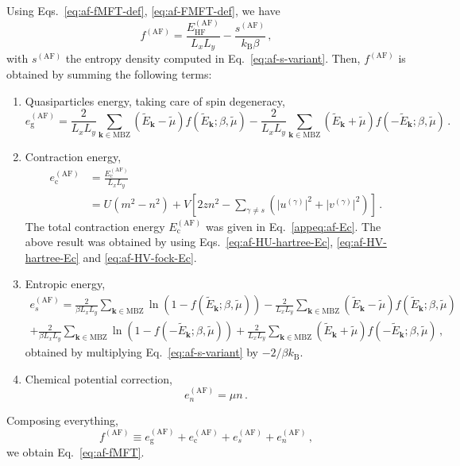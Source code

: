 \begin{tabproof}
	
	Using Eqs.~\eqref{eq:af-fMFT-def}, \eqref{eq:af-FMFT-def}, we have
	\[
	f^{(\mathrm{AF})} = \frac{E_\mathrm{HF}^{(\mathrm{AF})}}{L_x L_y} - \frac{s^{(\mathrm{AF})}}{k_\mathrm{B} \beta} \, ,
	\]
	with $s^{(\mathrm{AF})}$ the entropy density computed in Eq.~\eqref{eq:af-s-variant}. Then, $f^{(\mathrm{AF})}$ is obtained by summing the following terms:
	\begin{enumerate}
		\item Quasiparticles energy, taking care of spin degeneracy,
		\[
		e_\mathrm{g}^{(\mathrm{AF})} = \frac{2}{L_x L_y} \sum_{\mathbf{k} \in \mathrm{MBZ}} (\tilde{E}_\mathbf{k} - \tilde{\mu}) f( \tilde{E}_\mathbf{k}; \beta,\tilde{\mu}) - \frac{2}{L_x L_y} \sum_{\mathbf{k} \in \mathrm{MBZ}} (\tilde{E}_\mathbf{k} + \tilde{\mu}) f( -\tilde{E}_\mathbf{k}; \beta,\tilde{\mu}) \, .
		\]
		\item Contraction energy,
		\[
		\begin{aligned}
			e_\mathrm{c}^{(\mathrm{AF})} &= \frac{E_\mathrm{c}^{(\mathrm{AF})}}{L_x L_y} \\
			&= U(m^2 - n^2) + V \left[
			2zn^2 - \sum_{\gamma \neq s} \left(
			\big|u^{(\gamma)}\big|^2 + \big|v^{(\gamma)}\big|^2
			\right)
			\right] \, .
		\end{aligned}
		\]
		The total contraction energy $E_\mathrm{c}^{(\mathrm{AF})}$ was given in Eq.~\eqref{appeq:af-Ec}. The above result was obtained by using Eqs.~\eqref{eq:af-HU-hartree-Ec}, \eqref{eq:af-HV-hartree-Ec} and \eqref{eq:af-HV-fock-Ec}.
		\item Entropic energy,
		\begin{multline*}
			e_s^{(\mathrm{AF})} = \frac{2}{\beta L_x L_y} \sum_{\mathbf{k}\in\mathrm{MBZ}} \ln \left(
			1- f( \tilde{E}_\mathbf{k}; \beta,\tilde{\mu}) \right) - \frac{2}{L_x L_y} \sum_{\mathbf{k}\in\mathrm{MBZ}} (\tilde{E}_\mathbf{k}-\tilde{\mu}) f( \tilde{E}_\mathbf{k}; \beta,\tilde{\mu}) \\
			+ \frac{2}{\beta L_x L_y} \sum_{\mathbf{k}\in\mathrm{MBZ}} \ln \left(
			1- f( -\tilde{E}_\mathbf{k}; \beta,\tilde{\mu}) \right) + \frac{2}{L_x L_y} \sum_{\mathbf{k}\in\mathrm{MBZ}} (\tilde{E}_\mathbf{k}+\tilde{\mu}) f( -\tilde{E}_\mathbf{k}; \beta,\tilde{\mu}) \, ,
		\end{multline*}
		obtained by multiplying Eq.~\eqref{eq:af-s-variant} by $-2/\beta k_\mathrm{B}$.
		\item Chemical potential correction,
		\[
		e_n^{(\mathrm{AF})} = \mu n \, .
		\]
	\end{enumerate}
	Composing everything,
	\[
	f^{(\mathrm{AF})} \equiv e_\mathrm{g}^{(\mathrm{AF})} + e_\mathrm{c}^{(\mathrm{AF})} + e_s^{(\mathrm{AF})} + e_n^{(\mathrm{AF})} \, ,
	\]
	we obtain Eq.~\eqref{eq:af-fMFT}.
	
\end{tabproof}

